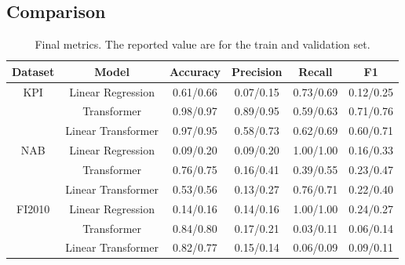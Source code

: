 \documentclass[a4paper, twoside]{report}
\theoremstyle{definition}
\numberwithin{equation}{section}
\begin{document}
\subsection{Comparison}


\begin{table}[h!]
    \centering
    \begin{tabular}{|c|c|c|c|c|c|}
        \hline
        Dataset & Model              & Accuracy  & Precision & Recall    & F1        \\
        \hline
        KPI     & Linear Regression  & 0.61/0.66 & 0.07/0.15 & 0.73/0.69 & 0.12/0.25 \\
                & Transformer        & 0.98/0.97 & 0.89/0.95 & 0.59/0.63 & 0.71/0.76 \\
                & Linear Transformer & 0.97/0.95 & 0.58/0.73 & 0.62/0.69 & 0.60/0.71 \\
        \hline
        NAB     & Linear Regression  & 0.09/0.20 & 0.09/0.20 & 1.00/1.00 & 0.16/0.33 \\
                & Transformer        & 0.76/0.75 & 0.16/0.41 & 0.39/0.55 & 0.23/0.47 \\
                & Linear Transformer & 0.53/0.56 & 0.13/0.27 & 0.76/0.71 & 0.22/0.40 \\
        \hline
        FI2010  & Linear Regression  & 0.14/0.16 & 0.14/0.16 & 1.00/1.00 & 0.24/0.27 \\
                & Transformer        & 0.84/0.80 & 0.17/0.21 & 0.03/0.11 & 0.06/0.14 \\
                & Linear Transformer & 0.82/0.77 & 0.15/0.14 & 0.06/0.09 & 0.09/0.11 \\
        \hline
    \end{tabular}
    \caption{Final metrics. The reported value are for the train and validation set.}
    \label{tab:final_metrics}
\end{table}
\end{document}
